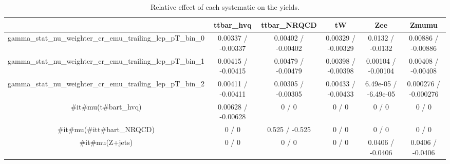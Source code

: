 \documentclass[10pt]{article}
\begin{document}
\begin{table}[htbp]
\begin{center}
\begin{tabular}{|c|c|c|c|c|c|}
\hline 
      & ttbar_hvq      & ttbar_NRQCD      & tW      & Zee      & Zmumu \\ 
\hline 
  gamma_stat_nu_weighter_cr_emu_trailing_lep_pT_bin_0 & 0.00337 / -0.00337 & 0.00402 / -0.00402 & 0.00329 / -0.00329 & 0.0132 / -0.0132 & 0.00886 / -0.00886 \\ 
  gamma_stat_nu_weighter_cr_emu_trailing_lep_pT_bin_1 & 0.00415 / -0.00415 & 0.00479 / -0.00479 & 0.00398 / -0.00398 & 0.00104 / -0.00104 & 0.00408 / -0.00408 \\ 
  gamma_stat_nu_weighter_cr_emu_trailing_lep_pT_bin_2 & 0.00411 / -0.00411 & 0.00305 / -0.00305 & 0.00433 / -0.00433 & 6.49e-05 / -6.49e-05 & 0.000276 / -0.000276 \\ 
  #it{#mu}(t#bar{t}_{hvq}) & 0.00628 / -0.00628 & 0 / 0 & 0 / 0 & 0 / 0 & 0 / 0 \\ 
  #it{#mu}(#it{t#bar{t}}_{NRQCD}) & 0 / 0 & 0.525 / -0.525 & 0 / 0 & 0 / 0 & 0 / 0 \\ 
  #it{#mu}(Z+jets) & 0 / 0 & 0 / 0 & 0 / 0 & 0.0406 / -0.0406 & 0.0406 / -0.0406 \\ 
\hline 
\end{tabular} 
\caption{Relative effect of each systematic on the yields.} 
\end{center} 
\end{table} 
\end{document}
